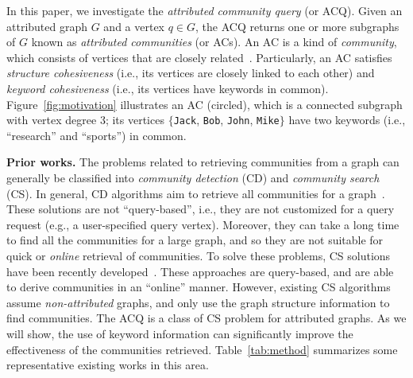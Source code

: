 In this paper, we investigate the {\it attributed community query} (or ACQ). Given an attributed graph $G$ and a vertex $q \in G$, the ACQ returns one or more subgraphs of $G$ known as {\it attributed communities} (or ACs).  An AC is a kind of {\it community}, which consists of vertices that are closely related~\cite{KDD2010,local2014,online-sigmod2013,k-truss2014,community-phy2004,community-phy2010}.  Particularly, an AC satisfies {\it structure cohesiveness} (i.e., its vertices are closely linked to each other) and {\it keyword cohesiveness} (i.e., its vertices have keywords in common). Figure~\ref{fig:motivation} illustrates an AC (circled), which is a connected subgraph with vertex degree 3; its vertices $\{${\tt Jack}, {\tt Bob}, {\tt John}, {\tt Mike}$\}$ have two keywords (i.e., ``research'' and ``sports'') in common.

{\bf Prior works.} %
The problems related to retrieving communities from a graph can generally be classified into {\it community detection} (CD) and {\it community search} (CS).  In general, CD algorithms aim to retrieve all communities for a graph~\cite{community-phy2004,community-phy2010,attr-vldb2009,attr-topic-kdd2008,attr-topic-icml2009,attr-topic-sigmod2012,attr-www2013}. These solutions are not ``query-based'', i.e., they are not customized for a query request (e.g., a user-specified query vertex).
Moreover, they can take a long time to find all the communities for a large graph, and so they are not suitable for quick or {\it online} retrieval of communities. To solve these problems, CS solutions have been recently developed~\cite{KDD2010,local2014,online-sigmod2013,k-truss2014}. These approaches are query-based, and are able to derive communities in an ``online'' manner. However, existing CS algorithms assume {\it non-attributed} graphs, and only use the graph structure information to find communities. The ACQ is a class of CS problem for attributed graphs. As we will show, the use of keyword information can significantly improve the effectiveness of the communities retrieved. Table~\ref{tab:method} summarizes some representative existing works in this area.

